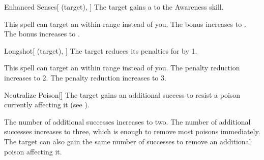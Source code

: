 \lowercase{\hypertarget{spell:Enhanced Senses}{}}\label{spell:Enhanced Senses}
\begin{attuneability}[Rank 1]{\hypertarget{spell:Enhanced Senses}{Enhanced Senses}}[ (target), ]
The target gains a   to the Awareness skill.

\rankline
{} This spell can target an  within \rngmed range instead of you.
 The bonus increases to .
 The bonus increases to .

\end{attuneability}
\vspace{0.25em}



\lowercase{\hypertarget{spell:Longshot}{}}\label{spell:Longshot}
\begin{attuneability}[Rank 1]{\hypertarget{spell:Longshot}{Longshot}}[ (target), ]
The target reduces its penalties for  by 1.

\rankline
{} This spell can target an  within \rngmed range instead of you.
 The penalty reduction increases to 2.
 The penalty reduction increases to 3.

\end{attuneability}
\vspace{0.25em}



\lowercase{\hypertarget{spell:Neutralize Poison}{}}\label{spell:Neutralize Poison}
\begin{freeability}[Rank 1]{\hypertarget{spell:Neutralize Poison}{Neutralize Poison}}[]
The target gains an additional success to resist a poison currently affecting it (see ).

\rankline
{} The number of additional successes increases to two.
 The number of additional successes increases to three, which is enough to remove most poisons immediately.
 The target can also gain the same number of successes to remove an additional poison affecting it.

\end{freeability}
\vspace{0.25em}



